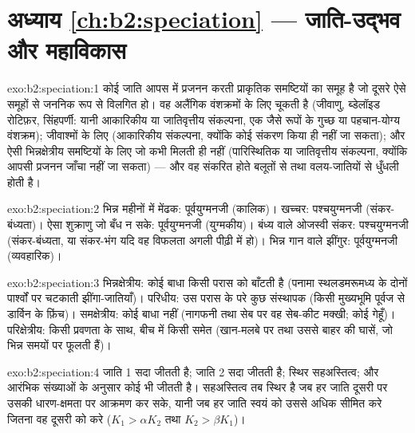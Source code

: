 \section*{अध्याय \ref{ch:b2:speciation} --- जाति-उद्भव और महाविकास}

\begin{solution}{exo:b2:speciation:1}
कोई जाति आपस में प्रजनन करती प्राकृतिक समष्टियों का समूह है जो
दूसरे ऐसे समूहों से जननिक रूप से विलगित हो। वह
अलैंगिक वंशक्रमों के लिए चूकती है (जीवाणु, ब्डेलॉइड रोटिफ़र, सिंहपर्णी:
यानी आकारिकीय या जातिवृत्तीय संकल्पना, एक जैसे रूपों के गुच्छ या
पहचान-योग्य वंशक्रम); जीवाश्मों के लिए (आकारिकीय संकल्पना, क्योंकि
कोई संकरण किया ही नहीं जा सकता); और ऐसी भिन्नक्षेत्रीय समष्टियों के लिए जो कभी
मिलती ही नहीं (पारिस्थितिक या जातिवृत्तीय संकल्पना, क्योंकि आपसी प्रजनन
जाँचा नहीं जा सकता) --- और वह संकरित होते बलूतों से तथा
वलय-जातियों से धुँधली होती है।
\end{solution}

\begin{solution}{exo:b2:speciation:2}
भिन्न महीनों में मेंढक: पूर्वयुग्मनजी (कालिक)। खच्चर: पश्चयुग्मनजी
(संकर-बंध्यता)। ऐसा शुक्राणु जो बँध न सके: पूर्वयुग्मनजी (युग्मकीय)।
बंध्य  वाले ओजस्वी संकर: पश्चयुग्मनजी (संकर-बंध्यता,
या संकर-भंग यदि वह विफलता अगली पीढ़ी में हो)।
भिन्न गान वाले झींगुर: पूर्वयुग्मनजी (व्यवहारिक)।
\end{solution}

\begin{solution}{exo:b2:speciation:3}
भिन्नक्षेत्रीय: कोई बाधा किसी परास को बाँटती है (पनामा स्थलडमरूमध्य के दोनों
पार्श्वों पर चटकाती झींगा-जातियाँ)। परिधीय: उस परास के परे कुछ संस्थापक
(किसी मुख्यभूमि पूर्वज से डार्विन के फ़िंच)। समक्षेत्रीय:
कोई बाधा नहीं (नागफनी तथा सेब पर वह सेब-कीट मक्खी; कोई
 गेहूँ)। परिक्षेत्रीय: किसी प्रवणता के साथ, बीच में किसी
 समेत (खान-मलबे पर तथा उससे बाहर की घासें, जो
भिन्न समयों पर फूलती हैं)।
\end{solution}

\begin{solution}{exo:b2:speciation:4}
जाति 1 सदा जीतती है; जाति 2 सदा जीतती है; स्थिर सहअस्तित्व;
और आरंभिक संख्याओं के अनुसार कोई भी जीतती है। सहअस्तित्व तब स्थिर है
जब हर जाति दूसरी पर उसकी धारण-क्षमता पर आक्रमण कर सके,
यानी जब हर जाति स्वयं को उससे अधिक सीमित करे जितना वह
दूसरी को करे ($K_1 > \alpha K_2$ तथा $K_2 > \beta K_1$)।
\end{solution}


